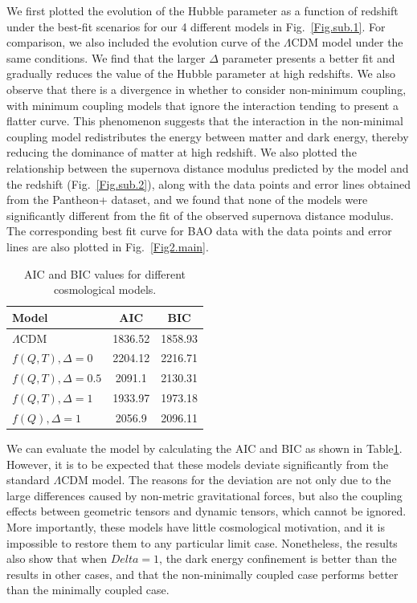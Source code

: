 \documentclass[a4paper,fleqn]{cas-sc}
\begin{document}
We first plotted the evolution of the Hubble parameter as a function of redshift under the best-fit scenarios for our 4 different models in Fig.~\ref{Fig.sub.1}. For comparison, we also included the evolution curve of the $\Lambda$CDM model under the same conditions. We find that the larger $\Delta$ parameter presents a better fit and gradually reduces the value of the Hubble parameter at high redshifts. We also observe that there is a divergence in whether to consider non-minimum coupling, with minimum coupling models that ignore the interaction tending to present a flatter curve. This phenomenon suggests that the interaction in the non-minimal coupling model redistributes the energy between matter and dark energy, thereby reducing the dominance of matter at high redshift. We also plotted the relationship between the supernova distance modulus predicted by the model and the redshift  (Fig.~\ref{Fig.sub.2}), along with the data points and error lines obtained from the Pantheon+ dataset, and we found that none of the models were significantly different from the fit of the observed supernova distance modulus. The corresponding best fit curve for BAO data with the data points and error lines are also plotted in  Fig.~\ref{Fig2.main}.

\begin{table}[htbp]
    \centering
    \caption{AIC and BIC values for different cosmological models.}
    \begin{tabular}{lcc}
    \toprule
    Model & AIC & BIC \\
    \midrule
    $\Lambda$CDM & 1836.52 & 1858.93 \\
    $f(Q,T), \Delta=0$ & 2204.12 & 2216.71 \\
    $f(Q,T), \Delta=0.5$ & 2091.1 & 2130.31 \\
    $f(Q,T), \Delta=1$ & 1933.97 & 1973.18 \\
    $f(Q), \Delta=1$ & 2056.9 & 2096.11 \\
    \bottomrule
    \end{tabular}
    \label{tab:AICBIC}
\end{table}

We can evaluate the model by calculating the AIC and BIC as shown in Table\ref{tab:AICBIC}. However, it is to be expected that these models deviate significantly from the standard $\Lambda$CDM model. The reasons for the deviation are not only due to the large differences caused by non-metric gravitational forces, but also the coupling effects between geometric tensors and dynamic tensors, which cannot be ignored. More importantly, these models have little cosmological motivation, and it is impossible to restore them to any particular limit case\cite{rudraObservationalConstraintFRT2021}. Nonetheless, the results also show that when $Delta=1$, the dark energy confinement is better than the results in other cases, and that the non-minimally coupled case performs better than the minimally coupled case.
\end{document}
